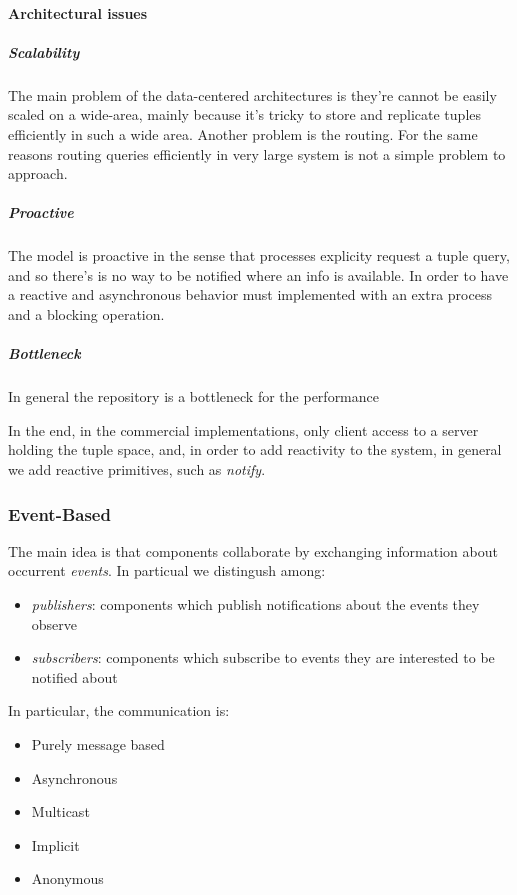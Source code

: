     \paragraph{Architectural issues}
    \subparagraph{Scalability}
    The main problem of the data-centered architectures is they're cannot be easily scaled
    on a wide-area, mainly because it's tricky to store and replicate tuples efficiently in 
    such a wide area. Another problem is the routing. For the same reasons routing queries
    efficiently in very large system is not a simple problem to approach.
    \subparagraph{Proactive}
    The model is proactive in the sense that processes explicity request a tuple query,
    and so there's is no way to be notified where an info is available. In order to have a
    reactive and asynchronous behavior must implemented with an extra process and a
    blocking operation.
    \subparagraph{Bottleneck}
    In general the repository is a bottleneck for the performance

    In the end, in the commercial implementations, only client access to a server holding the
    tuple space, and, in order to add reactivity to the system, in general we add reactive
    primitives, such as \textit{notify}.

    \subsubsection{Event-Based}
    The main idea is that components collaborate by exchanging information about occurrent \textit{events}.
    In particual we distingush among:
    \begin{itemize}
        \item \textit{publishers}: components which publish notifications about the events they observe
        \item \textit{subscribers}: components which subscribe to events they are interested to be notified about
    \end{itemize}
    In particular, the communication is:
    \begin{itemize}
        \item Purely message based
        \item Asynchronous
        \item Multicast
        \item Implicit
        \item Anonymous
    \end{itemize}

